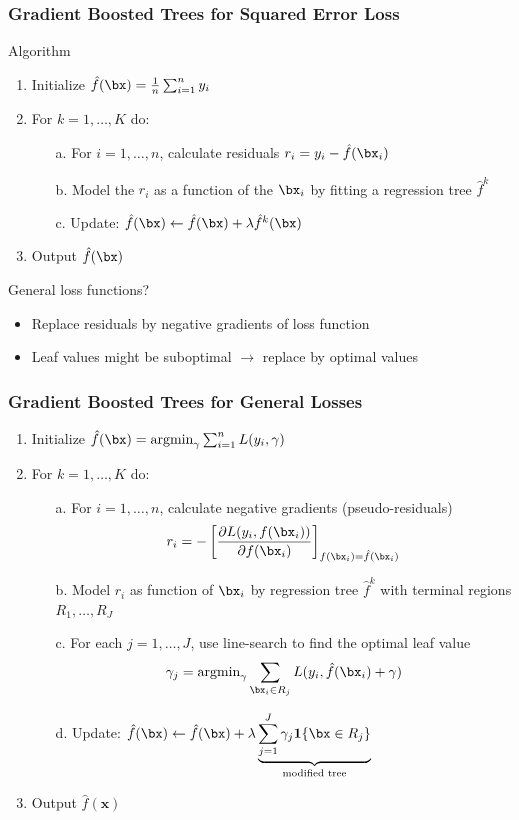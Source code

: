 \begin{frame}
	\frametitle{Gradient Boosted Trees for Squared Error Loss}
	\begin{block}{Algorithm}
		\begin{enumerate}
			\item Initialize $\hat f(\bx) = \frac{1}{n}\sum_{i = 1}^{n} y_i$
			\item For $k = 1, \dots, K$ do:
			\begin{enumerate}
				\item[a.] For $i = 1, \dots, n$, calculate residuals $r_i = y_i - \hat f(\bx_i)$
				\item[b.] Model the $r_i$ as a function of the $\bx_i$ by fitting a regression tree $\hat f^k$
				\item[c.] Update: $\hat f(\bx) \leftarrow \hat f(\bx) + \lambda \hat f^k(\bx)$
			\end{enumerate}
			\item Output $\hat f(\bx)$
		\end{enumerate}
	\end{block}
	
	\begin{block}{General loss functions?}
		\begin{itemize}
			\item Replace residuals by negative gradients of loss function
			\item Leaf values might be suboptimal $\rightarrow$ replace by optimal values
		\end{itemize}
	\end{block}
\end{frame}

\begin{frame}
	\frametitle{Gradient Boosted Trees for General Losses}
	\begin{enumerate}
		\item Initialize $\hat f(\bx) = \text{argmin}_\gamma \sum_{i = 1}^{n} L(y_i, \gamma)$
		\item For $k = 1, \dots, K$ do:
		\begin{enumerate}
			\item[a.] For $i = 1, \dots, n$, calculate negative gradients (pseudo-residuals)
			$$
			r_i = -\left[\frac{\partial L(y_i, f(\bx_i))}{\partial f(\bx_i)}\right]_{f(\bx_i) = \hat f(\bx_i)}
			$$
			\item[b.] Model $r_i$ as function of $\bx_i$ by regression tree $\hat f^k$ with terminal regions $R_1, \dots, R_J$
			\item[c.] For each $j = 1, \dots, J$, use line-search to find the optimal leaf value 
			$$
			\gamma_j = \text{argmin}_{\gamma} \sum_{\bx_i \in R_j} L(y_i, \hat f(\bx_i) + \gamma)
			$$
			\vspace{-1em}
			\item[d.] Update: $\hat f(\bx) \leftarrow \hat f(\bx) + \lambda \underbrace{\sum_{j = 1}^{J} \gamma_j \boldsymbol 1\{\bx \in R_j\}}_{\text{modified tree}}$
		\end{enumerate}
		\item Output $\hat f(\boldsymbol x)$
	\end{enumerate}
\end{frame}

